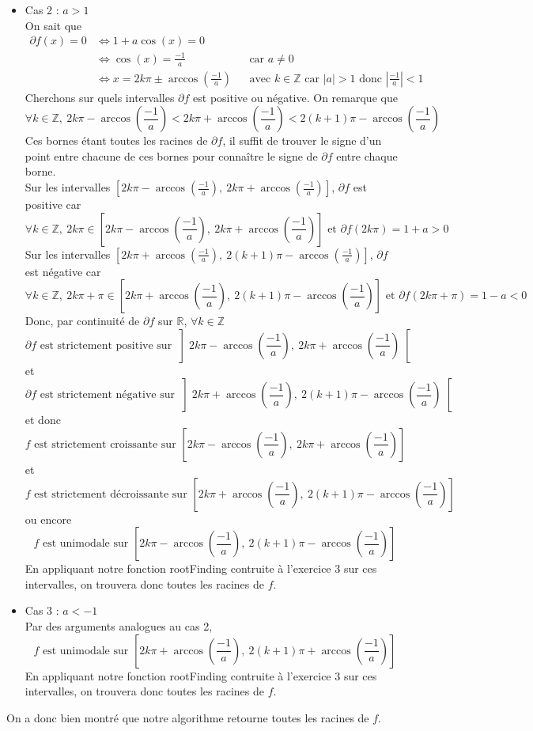 \documentclass[a4paper, 12pt]{article}
\begin{document}
\begin{itemize}
    \item Cas 2 : \( a > 1 \) \\
On sait que
\begin{align*}
    \partial f(x) = 0 & \Longleftrightarrow 1 + a \cos(x) = 0 \\
    & \Longleftrightarrow \cos(x) = \frac{-1}{a} && \text{car } a \neq 0 \\
    & \Longleftrightarrow x = 2k \pi \pm \arccos\left(\frac{-1}{a}\right) && \text{avec } k \in \mathbb{Z} \text{ car } |a| > 1 \text{ donc } \left|\frac{-1}{a}\right| < 1
\end{align*}
Cherchons sur quels intervalles \( \partial f \) est positive ou négative. On remarque que
$$
\forall k \in \mathbb{Z},~ 2k \pi - \arccos\left(\frac{-1}{a}\right) < 2k \pi + \arccos\left(\frac{-1}{a}\right) < 2(k+1) \pi - \arccos\left(\frac{-1}{a}\right)
$$
Ces bornes étant toutes les racines de \( \partial f \), il suffit de trouver le signe d'un point entre chacune de ces bornes pour connaître le signe de \( \partial f \) entre chaque borne. \\
Sur les intervalles \( \left[ 2k \pi - \arccos\left(\frac{-1}{a}\right),~ 2k \pi + \arccos\left(\frac{-1}{a}\right) \right] \), \( \partial f \) est positive car
$$
\forall k \in \mathbb{Z},~ 2k \pi \in \left[ 2k \pi - \arccos\left(\frac{-1}{a}\right),~ 2k \pi + \arccos\left(\frac{-1}{a}\right) \right] \text{ et } \partial f(2k \pi) = 1 + a > 0
$$
Sur les intervalles \( \left[ 2k \pi + \arccos\left(\frac{-1}{a}\right),~ 2(k+1) \pi - \arccos\left(\frac{-1}{a}\right) \right] \), \( \partial f \) est négative car
$$
\forall k \in \mathbb{Z},~ 2k \pi + \pi \in \left[ 2k \pi + \arccos\left(\frac{-1}{a}\right),~ 2(k+1) \pi - \arccos\left(\frac{-1}{a}\right) \right] \text{ et } \partial f(2k \pi + \pi) = 1 - a < 0
$$
Donc, par continuité de \( \partial f \) sur \( \mathbb{R} \), \( \forall k \in \mathbb{Z} \)
$$
\partial f \text{ est strictement positive sur } \left] 2k \pi - \arccos\left(\frac{-1}{a}\right),~ 2k \pi + \arccos\left(\frac{-1}{a}\right) \right[
$$
et
$$
\partial f \text{ est strictement négative sur } \left] 2k \pi + \arccos\left(\frac{-1}{a}\right),~ 2(k+1) \pi - \arccos\left(\frac{-1}{a}\right) \right[
$$
et donc
$$
f \text{ est strictement croissante sur } \left[ 2k \pi - \arccos\left(\frac{-1}{a}\right),~ 2k \pi + \arccos\left(\frac{-1}{a}\right) \right]
$$
et
$$
f \text{ est strictement décroissante sur } \left[ 2k \pi + \arccos\left(\frac{-1}{a}\right),~ 2(k+1) \pi - \arccos\left(\frac{-1}{a}\right) \right]
$$
ou encore
$$
f \text{ est unimodale sur } \left[ 2k \pi - \arccos\left(\frac{-1}{a}\right),~ 2(k+1) \pi - \arccos\left(\frac{-1}{a}\right) \right]
$$
En appliquant notre fonction rootFinding contruite à l'exercice 3 sur ces intervalles, on trouvera donc toutes les racines de \( f \).

    \item Cas 3 : \( a < -1 \) \\
Par des arguments analogues au cas 2,
$$
f \text{ est unimodale sur } \left[ 2k \pi + \arccos\left(\frac{-1}{a}\right),~ 2(k+1) \pi + \arccos\left(\frac{-1}{a}\right) \right]
$$
En appliquant notre fonction rootFinding contruite à l'exercice 3 sur ces intervalles, on trouvera donc toutes les racines de \( f \).
\end{itemize}
On a donc bien montré que notre algorithme retourne toutes les racines de \( f \).
\end{document}
